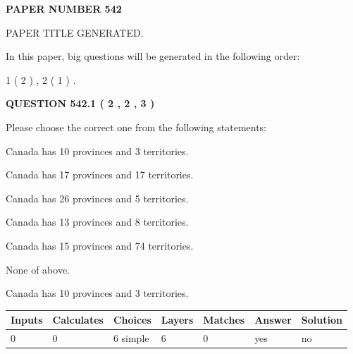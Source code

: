 \documentclass[12pt]{article}
\begin{document}
   
 {\textbf{ \Large{ PAPER NUMBER  542  }}}
   
   
\vspace{0.2in}
   
   
   
   
   
   
   
   
 \vspace{0.2in}
 
 
 
 
   
   
 PAPER TITLE GENERATED.
   
   
   
\vspace{0.2in}
   
In this paper, big questions will be generated in the following order: 
   
   
   1 ( 2 )
 ,
   2 ( 1 )
 .
  
\vspace{0.2in}
  
{\textbf{\Large{QUESTION
542.1 
 ( 2 , 2 , 3 )
}}}
  
  
Please choose the correct one from the following statements:
 
 
Canada has 10  provinces and 3 territories.
 
 
Canada has  17 provinces and  17 territories.
 
 
Canada has  26 provinces and  5 territories.
 
 
Canada has  13 provinces and  8 territories.
 
 
Canada has  15 provinces and  74 territories.
 
 
 None of above.
 
 
\noindent{}
 
 
Canada has 10  provinces and 3 territories.
 
 
\noindent{}
 
 
   
   
   
   
\noindent\begin{tabular}{|l|l|l|l|l|l|l|}
 \hline
Inputs & Calculates & Choices & Layers & Matches & Answer & Solution \\ \hline
 0  & 
 0  & 
 6
  simple  
  & 
 6  & 
 0  & 
  yes & 
  no 
  \\ \hline
 \end{tabular}
   
\end{document}
